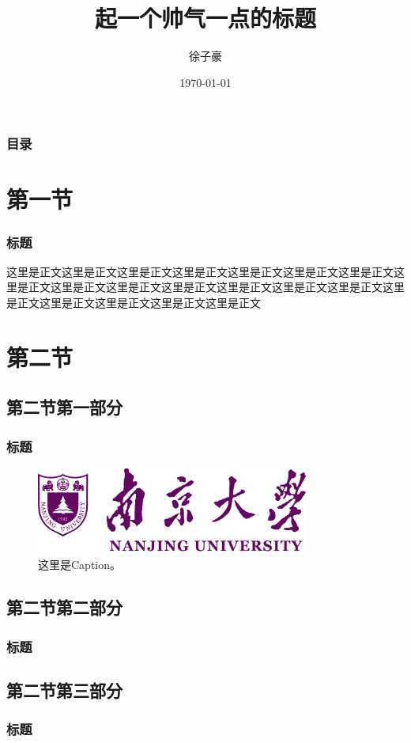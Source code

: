 \documentclass[xetex,mathserif,serif,handout]{beamer}
\begin{document}
	\title{起一个帅气一点的标题}
	\author{徐子豪}
	\date{\today}

	\frame{\titlepage}

	\begin{frame}
		\frametitle{目录}
		\makecontents
	\end{frame}

	\section{第一节}
	\begin{frame}
		\frametitle{标题}
		这里是正文这里是正文这里是正文这里是正文这里是正文这里是正文这里是正文这里是正文这里是正文这里是正文这里是正文这里是正文这里是正文这里是正文这里是正文这里是正文这里是正文这里是正文这里是正文\cite{XENON1T:SD}
	\end{frame}

	\section{第二节}
	\subsection{第二节第一部分}
	\begin{frame}
		\frametitle{标题}
		\begin{figure}
			\centering
			\includegraphics[width=0.8\textwidth]{logo/NJU_LogoAndName.jpg}
			\caption{这里是Caption。}
		\end{figure}
	\end{frame}
	\subsection{第二节第二部分}
	\begin{frame}
		\frametitle{标题}
	\end{frame}
	\subsection{第二节第三部分}
	\begin{frame}
		\frametitle{标题}
	\end{frame}
\end{document}
